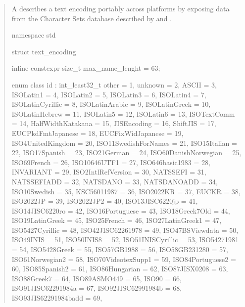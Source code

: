 \documentclass{wg21}
\begin{document}
\begin{quote}
\begin{addedblock}

A  describes a text encoding portably across platforms by exposing data from the Character Sets database described by \cite{rfc2978} and \cite{rfc3808}.

\begin{codeblock}

namespace std {

struct text_encoding{
    
    inline constexpr size_t max_name_lenght = 63;
    
    enum class id : int_least32_t {
        other = 1,
        unknown = 2,
        ASCII = 3,
        ISOLatin1 = 4,
        ISOLatin2 = 5,
        ISOLatin3 = 6,
        ISOLatin4 = 7,
        ISOLatinCyrillic = 8,
        ISOLatinArabic = 9,
        ISOLatinGreek = 10,
        ISOLatinHebrew = 11,
        ISOLatin5 = 12,
        ISOLatin6 = 13,
        ISOTextComm = 14,
        HalfWidthKatakana = 15,
        JISEncoding = 16,
        ShiftJIS = 17,
        EUCPkdFmtJapanese = 18,
        EUCFixWidJapanese = 19,
        ISO4UnitedKingdom = 20,
        ISO11SwedishForNames = 21,
        ISO15Italian = 22,
        ISO17Spanish = 23,
        ISO21German = 24,
        ISO60DanishNorwegian = 25,
        ISO69French = 26,
        ISO10646UTF1 = 27,
        ISO646basic1983 = 28,
        INVARIANT = 29,
        ISO2IntlRefVersion = 30,
        NATSSEFI = 31,
        NATSSEFIADD = 32,
        NATSDANO = 33,
        NATSDANOADD = 34,
        ISO10Swedish = 35,
        KSC56011987 = 36,
        ISO2022KR = 37,
        EUCKR = 38,
        ISO2022JP = 39,
        ISO2022JP2 = 40,
        ISO13JISC6220jp = 41,
        ISO14JISC6220ro = 42,
        ISO16Portuguese = 43,
        ISO18Greek7Old = 44,
        ISO19LatinGreek = 45,
        ISO25French = 46,
        ISO27LatinGreek1 = 47,
        ISO5427Cyrillic = 48,
        ISO42JISC62261978 = 49,
        ISO47BSViewdata = 50,
        ISO49INIS = 51,
        ISO50INIS8 = 52,
        ISO51INISCyrillic = 53,
        ISO54271981 = 54,
        ISO5428Greek = 55,
        ISO57GB1988 = 56,
        ISO58GB231280 = 57,
        ISO61Norwegian2 = 58,
        ISO70VideotexSupp1 = 59,
        ISO84Portuguese2 = 60,
        ISO85Spanish2 = 61,
        ISO86Hungarian = 62,
        ISO87JISX0208 = 63,
        ISO88Greek7 = 64,
        ISO89ASMO449 = 65,
        ISO90 = 66,
        ISO91JISC62291984a = 67,
        ISO92JISC62991984b = 68,
        ISO93JIS62291984badd = 69,
}}}
\end{codeblock}
\end{addedblock}
\end{quote}
\end{document}
